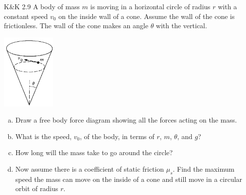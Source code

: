 \documentclass{esg8012pset}
\begin{document}
\begin{problem}{K\&K 2.9}
  A body of mass $m$ is moving in a horizontal circle of radius $r$ with a constant speed $v_0$ on the inside wall of a cone. Assume the wall of the cone is frictionless. The wall of the cone makes an angle $\theta$ with the vertical.
  \begin{center}\includegraphics[width=0.2\textwidth]{ps02_3}\end{center}
  \begin{enumerate}[a)]
    \item Draw a free body force diagram showing all the forces acting on the mass.
    \item What is the speed, $v_0$, of the body, in terms of $r$, $m$, $\theta$, and $g$?
    \item How long will the mass take to go around the circle?
    \item Now assume there is a coefficient of static friction $\mu_s$. Find the maximum speed the mass can move on the inside of a cone and still move in a circular orbit of radius $r$.
  \end{enumerate}
\end{problem}
\end{document}

